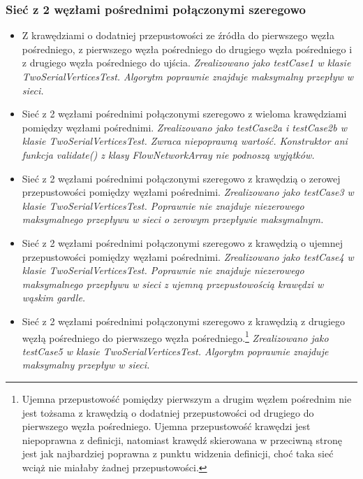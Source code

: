 \subsubsection{Sieć z 2 węzłami pośrednimi połączonymi szeregowo}

\begin{itemize}[nosep]
    \item Z krawędziami o dodatniej przepustowości ze źródła do pierwszego węzła
    pośredniego, z pierwszego węzła pośredniego do drugiego węzła pośredniego i z
    drugiego węzła pośredniego do ujścia.
    \emph{Zrealizowano jako testCase1 w klasie TwoSerialVerticesTest. Algorytm
    poprawnie znajduje maksymalny przepływ w sieci.}

    \item Sieć z 2 węzłami pośrednimi połączonymi szeregowo z wieloma
    krawędziami pomiędzy węzłami pośrednimi.
    \emph{Zrealizowano jako testCase2a i testCase2b w klasie TwoSerialVerticesTest.
    Zwraca niepoprawną wartość. Konstruktor ani funkcja validate()
    z klasy FlowNetworkArray nie podnoszą wyjątków.}

    \item Sieć z 2 węzłami pośrednimi połączonymi szeregowo z krawędzią o
    zerowej przepustowości pomiędzy węzłami pośrednimi.
    \emph{Zrealizowano jako testCase3 w klasie TwoSerialVerticesTest. Poprawnie
    nie znajduje niezerowego maksymalnego przepływu
    w sieci o zerowym przepływie maksymalnym.}

    \item Sieć z 2 węzłami pośrednimi połączonymi szeregowo z krawędzią o
    ujemnej przepustowości pomiędzy węzłami pośrednimi.
    \emph{Zrealizowano jako testCase4 w klasie TwoSerialVerticesTest. Poprawnie
    nie znajduje niezerowego maksymalnego przepływu
    w sieci z ujemną przepustowością krawędzi w wąskim gardle.}

    \item Sieć z 2 węzłami pośrednimi połączonymi szeregowo z krawędzią z
    drugiego węzłą pośredniego do pierwszego węzła pośredniego.\footnote{Ujemna
    przepustowość pomiędzy pierwszym a drugim węzłem pośrednim nie jest tożsama
    z krawędzią o dodatniej przepustowości od drugiego do pierwszego węzła
    pośredniego. Ujemna przepustowość krawędzi jest niepoprawna z definicji,
    natomiast krawędź skierowana w przeciwną stronę jest jak najbardziej
    poprawna z punktu widzenia definicji, choć taka sieć wciąż nie miałaby
    żadnej przepustowości.}
    \emph{Zrealizowano jako testCase5 w klasie TwoSerialVerticesTest. Algorytm
    poprawnie znajduje maksymalny przepływ w sieci.}


\end{itemize}
